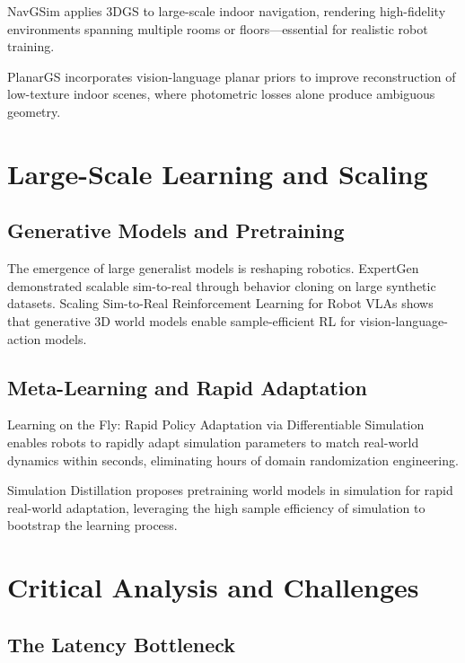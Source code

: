 \documentclass[journal]{IEEEtran}
\begin{document}
NavGSim \cite{navgsim2026} applies 3DGS to large-scale indoor navigation, rendering high-fidelity environments spanning multiple rooms or floors---essential for realistic robot training.

PlanarGS \cite{planargs2026} incorporates vision-language planar priors to improve reconstruction of low-texture indoor scenes, where photometric losses alone produce ambiguous geometry.

\section{Large-Scale Learning and Scaling}

\subsection{Generative Models and Pretraining}

The emergence of large generalist models is reshaping robotics. ExpertGen \cite{expertgen2026} demonstrated scalable sim-to-real through behavior cloning on large synthetic datasets. Scaling Sim-to-Real Reinforcement Learning for Robot VLAs \cite{scaling_vla2026} shows that generative 3D world models enable sample-efficient RL for vision-language-action models.

\subsection{Meta-Learning and Rapid Adaptation}

Learning on the Fly: Rapid Policy Adaptation via Differentiable Simulation \cite{lof2025} enables robots to rapidly adapt simulation parameters to match real-world dynamics within seconds, eliminating hours of domain randomization engineering.

Simulation Distillation \cite{simdist2026} proposes pretraining world models in simulation for rapid real-world adaptation, leveraging the high sample efficiency of simulation to bootstrap the learning process.

\section{Critical Analysis and Challenges}

\subsection{The Latency Bottleneck}
\end{document}
